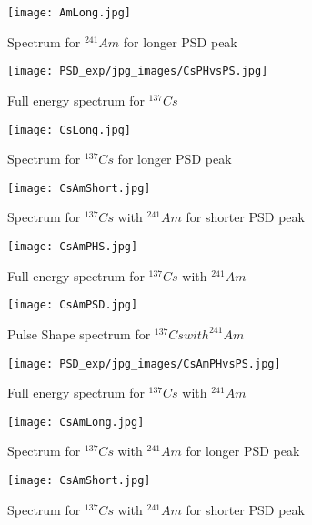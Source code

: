 \documentclass[10pt]{article}
\begin{document}
\begin{figure}[ht]
        \centering
        \texttt{[image: AmLong.jpg]}         
        \caption{Spectrum for $^{241}Am$ for longer PSD peak}
        \label{LongAm}
\end{figure}



\begin{figure}[ht]
        \centering
        \texttt{[image: PSD\_exp/jpg\_images/CsPHvsPS.jpg]}         
        \caption{Full energy spectrum for $^{137}Cs$}
        \label{PHvsPSCs}
\end{figure}
\begin{figure}[ht]
        \centering
        \texttt{[image: CsLong.jpg]}         
        \caption{Spectrum for $^{137}Cs$ for longer PSD peak}
        \label{LongCs}
\end{figure}
{\begin{figure}[ht]
        \centering
        \texttt{[image: CsAmShort.jpg]}         
        \caption{Spectrum for $^{137}Cs$ with $^{241}Am$ for shorter PSD peak}
        \label{ShortCsAm}
\end{figure}}
\begin{figure}[ht]
        \centering
        \texttt{[image: CsAmPHS.jpg]}         
        \caption{Full energy spectrum for $^{137}Cs$ with $^{241}Am$}
        \label{PHSCsAm}
\end{figure}
\begin{figure}[ht]
        \centering
        \texttt{[image: CsAmPSD.jpg]}         
        \caption{Pulse Shape spectrum for $^{137}Cs with ^{241}Am$}
        \label{PSDCsAm}
\end{figure}
\begin{figure}[ht]
        \centering
        \texttt{[image: PSD\_exp/jpg\_images/CsAmPHvsPS.jpg]}         
        \caption{Full energy spectrum for $^{137}Cs$ with $^{241}Am$}
        \label{PHvsPSCsAm}
\end{figure}
\begin{figure}[ht]
        \centering
        \texttt{[image: CsAmLong.jpg]}         
        \caption{Spectrum for $^{137}Cs$ with $^{241}Am$ for longer PSD peak}
        \label{LongCsAm}
\end{figure}
{\begin{figure}[ht]
        \centering
        \texttt{[image: CsAmShort.jpg]}         
        \caption{Spectrum for $^{137}Cs$ with $^{241}Am$ for shorter PSD peak}
        \label{ShortCsAm}
\end{figure}}
\end{document}
